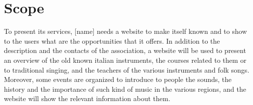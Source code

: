 \documentclass[../../DD.tex]{subfiles}
\begin{document}
\section{Scope}
To present its services, [name] needs a website to make itself known and to show to the users what are the opportunities that it offers.
\newline In addition to the description and the contacts of the association, a website will be used to present an overview of the old known italian instruments, the courses related to them or to traditional singing, and the teachers of the various instruments and folk songs. Moreover, some events are organized to introduce to people the sounds, the history and the importance of such kind of music in the various regions, and the website will show the relevant information about them.
\end{document}
